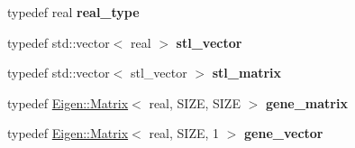 \begin{DoxyCompactItemize}
\mbox{\label{classeigen3__interface_a6d74132933df790c39787185aab7fe64}} 
typedef real {\bfseries real\+\_\+type}
\item 
\mbox{\label{classeigen3__interface_afe49c4a51968bc1e38084402b3ac8655}} 
typedef std\+::vector$<$ real $>$ {\bfseries stl\+\_\+vector}
\item 
\mbox{\label{classeigen3__interface_a5d5e9b0a01b31f1a3514ba8e94c36e47}} 
typedef std\+::vector$<$ stl\+\_\+vector $>$ {\bfseries stl\+\_\+matrix}
\item 
\mbox{\label{classeigen3__interface_a5bc270f7b09aa2b73ff9b564b733ac74}} 
typedef \hyperlink{group___core___module_class_eigen_1_1_matrix}{Eigen\+::\+Matrix}$<$ real, S\+I\+ZE, S\+I\+ZE $>$ {\bfseries gene\+\_\+matrix}
\item 
\mbox{\label{classeigen3__interface_aa3bdc03147bb79728d8b6fce9acbe548}} 
typedef \hyperlink{group___core___module_class_eigen_1_1_matrix}{Eigen\+::\+Matrix}$<$ real, S\+I\+ZE, 1 $>$ {\bfseries gene\+\_\+vector}
\end{DoxyCompactItemize}
